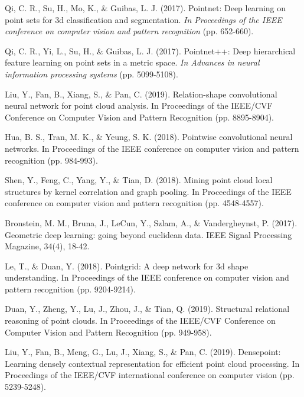 \documentclass[runningheads]{llncs}
\begin{document}
\begin{thebibliography}{18}

Qi, C. R., Su, H., Mo, K., \& Guibas, L. J. (2017). Pointnet: Deep learning on point sets for 3d classification and segmentation. \textit{In Proceedings of the IEEE conference on computer vision and pattern recognition} (pp. 652-660).


Qi, C. R., Yi, L., Su, H., \& Guibas, L. J. (2017). Pointnet++: Deep hierarchical feature learning on point sets in a metric space. \textit{In Advances in neural information processing systems} (pp. 5099-5108).

Liu, Y., Fan, B., Xiang, S., \& Pan, C. (2019). Relation-shape convolutional neural network for point cloud analysis. In Proceedings of the IEEE/CVF Conference on Computer Vision and Pattern Recognition (pp. 8895-8904).

Hua, B. S., Tran, M. K., \& Yeung, S. K. (2018). Pointwise convolutional neural networks. In Proceedings of the IEEE conference on computer vision and pattern recognition (pp. 984-993).

Shen, Y., Feng, C., Yang, Y., \& Tian, D. (2018). Mining point cloud local structures by kernel correlation and graph pooling. In Proceedings of the IEEE conference on computer vision and pattern recognition (pp. 4548-4557).

Bronstein, M. M., Bruna, J., LeCun, Y., Szlam, A., \& Vandergheynst, P. (2017). Geometric deep learning: going beyond euclidean data. IEEE Signal Processing Magazine, 34(4), 18-42.

Le, T., \& Duan, Y. (2018). Pointgrid: A deep network for 3d shape understanding. In Proceedings of the IEEE conference on computer vision and pattern recognition (pp. 9204-9214).

Duan, Y., Zheng, Y., Lu, J., Zhou, J., \& Tian, Q. (2019). Structural relational reasoning of point clouds. In Proceedings of the IEEE/CVF Conference on Computer Vision and Pattern Recognition (pp. 949-958).

Liu, Y., Fan, B., Meng, G., Lu, J., Xiang, S., \& Pan, C. (2019). Densepoint: Learning densely contextual representation for efficient point cloud processing. In Proceedings of the IEEE/CVF international conference on computer vision (pp. 5239-5248).


\end{thebibliography}
\end{document}
